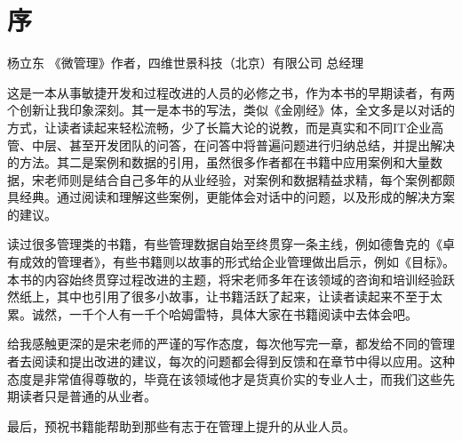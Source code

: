 \chapter*{序} %


杨立东 《微管理》作者，四维世景科技（北京）有限公司 总经理

这是一本从事敏捷开发和过程改进的人员的必修之书，作为本书的早期读者，有两个创新让我印象深刻。其一是本书的写法，类似《金刚经》体，全文多是以对话的方式，让读者读起来轻松流畅，少了长篇大论的说教，而是真实和不同IT企业高管、中层、甚至开发团队的问答，在问答中将普遍问题进行归纳总结，并提出解决的方法。其二是案例和数据的引用，虽然很多作者都在书籍中应用案例和大量数据，宋老师则是结合自己多年的从业经验，对案例和数据精益求精，每个案例都颇具经典。通过阅读和理解这些案例，更能体会对话中的问题，以及形成的解决方案的建议。

读过很多管理类的书籍，有些管理数据自始至终贯穿一条主线，例如德鲁克的《卓有成效的管理者》，有些书籍则以故事的形式给企业管理做出启示，例如《目标》。本书的内容始终贯穿过程改进的主题，将宋老师多年在该领域的咨询和培训经验跃然纸上，其中也引用了很多小故事，让书籍活跃了起来，让读者读起来不至于太累。诚然，一千个人有一千个哈姆雷特，具体大家在书籍阅读中去体会吧。

给我感触更深的是宋老师的严谨的写作态度，每次他写完一章，都发给不同的管理者去阅读和提出改进的建议，每次的问题都会得到反馈和在章节中得以应用。这种态度是非常值得尊敬的，毕竟在该领域他才是货真价实的专业人士，而我们这些先期读者只是普通的从业者。

最后，预祝书籍能帮助到那些有志于在管理上提升的从业人员。

\begin{description}
\item[]
\end{description}

